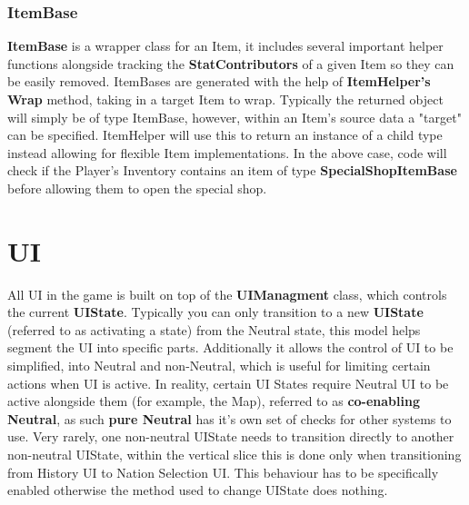 \documentclass{report}
\begin{document}
\subsubsection{ItemBase}

\textbf{ItemBase} is a wrapper class for an Item, it includes several important helper functions alongside tracking the \textbf{StatContributors} of a given Item so they can be easily removed. ItemBases are generated with the help of \textbf{ItemHelper's} \textbf{Wrap} method, taking in a target Item to wrap. Typically the returned object will simply be of type ItemBase, however, within an Item's source data a "target" can be specified. ItemHelper will use this to return an instance of a child type instead allowing for flexible Item implementations. In the above case, code will check if the Player's Inventory contains an item of type \textbf{SpecialShopItemBase} before allowing them to open the special shop.

\section{UI}

All UI in the game is built on top of the \textbf{UIManagment} class, which controls the current \textbf{UIState}. Typically you can only transition to a new \textbf{UIState} (referred to as activating a state) from the Neutral state, this model helps segment the UI into specific parts. Additionally it allows the control of UI to be simplified, into Neutral and non-Neutral, which is useful for limiting certain actions when UI is active. In reality, certain UI States require Neutral UI to be active alongside them (for example, the Map), referred to as \textbf{co-enabling Neutral}, as such \textbf{pure Neutral} has it's own set of checks for other systems to use. Very rarely, one non-neutral UIState needs to transition directly to another non-neutral UIState, within the vertical slice this is done only when transitioning from History UI to Nation Selection UI. This behaviour has to be specifically enabled otherwise the method used to change UIState does nothing.
\end{document}
